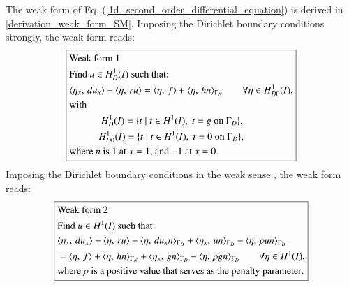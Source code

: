 \documentclass[review,3p]{elsarticle}
\begin{document}
The weak form of Eq. (\ref{1d_second_order_differential_equation}) is derived in \ref{derivation_weak_form_SM}. Imposing the Dirichlet boundary conditions strongly, the weak form reads:
\begin{equation}
\centering
\boxed{ 
\begin{aligned}
&\text{Weak~form}~ 1 ~~~~~~~~~\\
&\text{Find $u \in H _D^1 (I)$ such that:} \\
&\langle {\eta} _{ x }, \, du _{ x } \rangle + \langle\eta, \, ru\rangle = \langle\eta, \, f \rangle + \langle\eta, \, hn\rangle_{\Gamma _N} \qquad \forall \eta \in H _{D0}^1 (I),\\
&\text{with} \\
&~~~~~~~~~~~~~H_{D} ^1 (I) = \{t \; | \; t \in H^1 (I), \; t = g \text{ on } \Gamma _D \},  \\
&~~~~~~~~~~~~H_{D0} ^1 (I) = \{t \; | \; t \in H^1 (I), \; t = 0 \text{ on } \Gamma _D\},\\
&\text{where } {n} \text{ is 1 at $x=1$, and $-1$ at $x=0$.}
\end{aligned}		\label{1D_general_SM_weak_form_Diri_strong} 
}
\end{equation}
Imposing the Dirichlet boundary conditions in the weak sense \cite{freund1995weakly}, the weak form reads:
\begin{equation}
\centering
\boxed{
\begin{aligned}
&\text{Weak~form}~ 2 ~~~~~~~~~\\
&\text{Find } u \in H ^1 (I) \text{ such that:}\\
& \langle { \eta} _{ x }, \, du_x \rangle + \langle \eta, \, ru \rangle - \langle \eta, \, du_x n \rangle_{\Gamma _D} + \langle \eta _x, \, u n \rangle_{\Gamma _D} - \langle \eta, \, \rho u n \rangle_{\Gamma _D} \\ 
&= \langle \eta, \, f \rangle + \langle \eta, \, h n \rangle_{\Gamma _N} + \langle \eta _x, \, g n \rangle_{\Gamma _D} - \langle \eta, \, \rho g n \rangle_{\Gamma _D} \qquad \forall \eta \in H ^1 (I), \\
&\text{where } \rho \text{ is a } \text{{positive}} \text{ value that serves as the penalty parameter}.
\end{aligned}	\label{1D_general_SM_weak_form_Diri_weak}
}
\end{equation}
\end{document}
